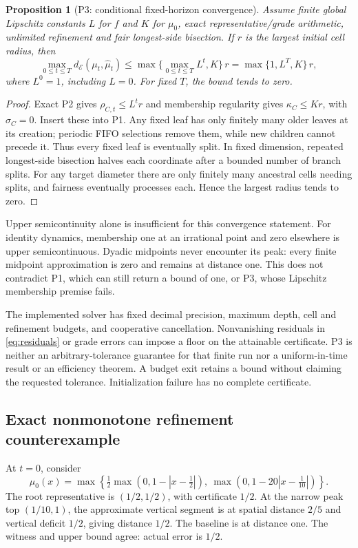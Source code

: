 \documentclass[10pt,a4paper]{article}
\newtheorem{proposition}{Proposition}
\newcommand{\E}{\mathcal{E}}
\newcommand{\dE}{d_{\E}}
\begin{document}
\begin{proposition}[P3: conditional fixed-horizon convergence]
Assume finite global Lipschitz constants $L$ for $f$ and $K$ for $\mu_0$,
exact representative/grade arithmetic, unlimited refinement and fair
longest-side bisection. If $r$ is the largest initial cell radius, then
\begin{equation}\label{eq:convergence}
 \max_{0\leq t\leq T}\dE(\mu_t,\widehat\mu_t)
 \leq \max\{\max_{0\leq t\leq T}L^t,K\}\,r
 =\max\{1,L^T,K\}\,r,
\end{equation}
where $L^0=1$, including $L=0$. For fixed $T$, the bound tends to zero.
\end{proposition}
\begin{proof}
Exact P2 gives $\rho_{C,t}\leq L^t r$ and membership regularity gives
$\kappa_C\leq Kr$, with $\sigma_C=0$. Insert these into P1. Any fixed
leaf has only finitely many older leaves at its creation; periodic FIFO
selections remove them, while new children cannot precede it. Thus every
fixed leaf is eventually split. In fixed dimension, repeated longest-side
bisection halves each coordinate after a bounded number of branch splits.
For any target diameter there are only finitely many ancestral cells needing
splits, and fairness eventually processes each. Hence the largest radius
tends to zero.
\end{proof}

Upper semicontinuity alone is insufficient for this convergence statement.
For identity dynamics, membership one at an irrational point and zero
elsewhere is upper semicontinuous. Dyadic midpoints never encounter its peak:
every finite midpoint approximation is zero and remains at distance one.
This does not contradict P1, which can still return a bound of one, or P3,
whose Lipschitz membership premise fails.

The implemented solver has fixed decimal precision, maximum depth, cell and
refinement budgets, and cooperative cancellation. Nonvanishing residuals in
\eqref{eq:residuals} or grade errors can impose a floor on the attainable
certificate. P3 is neither an
arbitrary-tolerance guarantee for that finite run nor a uniform-in-time result
or an efficiency theorem. A budget exit retains a bound without claiming the
requested tolerance. Initialization failure has no complete certificate.

\subsection{Exact nonmonotone refinement counterexample}
At $t=0$, consider
\begin{equation}
 \mu_0(x)=\max\left\{
  \tfrac12\max(0,1-|x-\tfrac12|),\
  \max(0,1-20|x-\tfrac1{10}|)\right\}.
\end{equation}
The root representative is $(1/2,1/2)$, with certificate $1/2$. At the narrow
peak top $(1/10,1)$, the approximate vertical segment is at spatial distance
$2/5$ and vertical deficit $1/2$, giving distance $1/2$. The baseline is at
distance one. The witness and upper bound agree: actual error is $1/2$.
\end{document}
